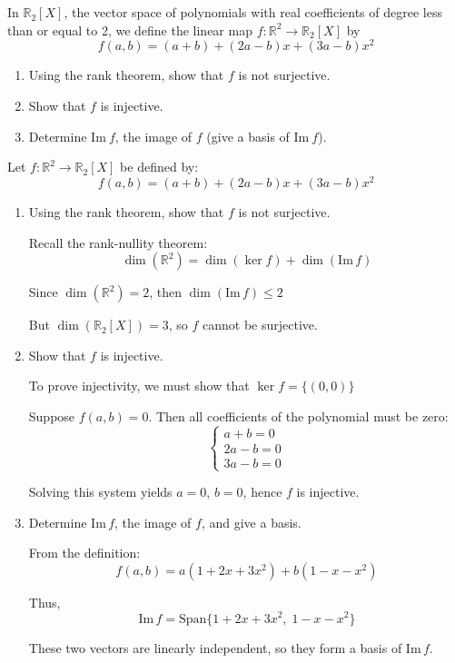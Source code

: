 \documentclass[12pt]{article}
\begin{document}
\newpage  
\section{}
In $\mathbb{R}_2[X]$, the vector space of polynomials with real coefficients of degree less than or equal to 2, we define the linear map $f: \mathbb{R}^2 \rightarrow \mathbb{R}_2[X]$ by
\begin{equation*}
f(a,b) = (a + b) + (2a - b)x + (3a - b)x^2
\end{equation*}

\begin{enumerate}
\item Using the rank theorem, show that $f$ is not surjective.
\item Show that $f$ is injective.
\item Determine $\text{Im}\ f$, the image of $f$ (give a basis of $\text{Im}\ f$).
\end{enumerate}

\newpage

\begin{answerbox}
Let $f: \mathbb{R}^2 \to \mathbb{R}_2[X]$ be defined by:
$$
f(a, b) = (a + b) + (2a - b)x + (3a - b)x^2
$$

\begin{enumerate}
\item Using the rank theorem, show that $f$ is not surjective.

Recall the rank-nullity theorem:
$$
\dim(\mathbb{R}^2) = \dim(\ker f) + \dim(\mathrm{Im}\,f)
$$

Since $\dim(\mathbb{R}^2) = 2$, then $\dim(\mathrm{Im}\,f) \leq 2$

But $\dim(\mathbb{R}_2[X]) = 3$, so $f$ cannot be surjective.

\item Show that $f$ is injective.

To prove injectivity, we must show that $\ker f = \{(0, 0)\}$

Suppose $f(a, b) = 0$. Then all coefficients of the polynomial must be zero:
$$
\begin{cases}
a + b = 0 \\
2a - b = 0 \\
3a - b = 0
\end{cases}
$$

Solving this system yields $a = 0$, $b = 0$, hence $f$ is injective.

\item Determine $\mathrm{Im}\,f$, the image of $f$, and give a basis.

From the definition:
$$
f(a, b) = a(1 + 2x + 3x^2) + b(1 - x - x^2)
$$

Thus,
$$
\mathrm{Im}\,f = \mathrm{Span}\{1 + 2x + 3x^2,\; 1 - x - x^2\}
$$

These two vectors are linearly independent, so they form a basis of $\mathrm{Im}\,f$.

\end{enumerate}
\end{answerbox}
\end{document}
